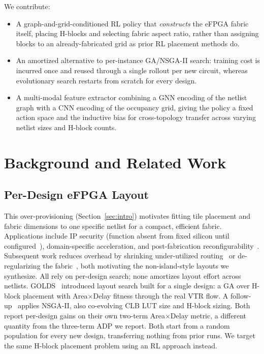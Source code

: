 \documentclass[sigconf]{acmart}
\begin{document}
\noindent We contribute:
\begin{itemize}[topsep=2pt,itemsep=2pt,leftmargin=2em]
  \item A graph-and-grid-conditioned RL policy that \emph{constructs} the
        eFPGA fabric itself, placing H-blocks and selecting fabric aspect
        ratio, rather than assigning blocks to an already-fabricated grid
        as prior RL placement methods do.
  \item An amortized alternative to per-instance GA/NSGA-II search:
        training cost is incurred once and reused through a single rollout
        per new circuit, whereas evolutionary search restarts from scratch
        for every design.
  \item A multi-modal feature extractor combining a GNN encoding of the
        netlist graph with a CNN encoding of the occupancy grid, giving the
        policy a fixed action space and the inductive bias for
        cross-topology transfer across varying netlist sizes and H-block
        counts.
\end{itemize}

\section{Background and Related Work}
\label{sec:related}

\subsection{Per-Design eFPGA Layout}

This over-provisioning (Section~\ref{sec:intro}) motivates fitting tile
placement and fabric dimensions to one specific netlist for a compact,
efficient fabric. Applications include IP security
(function absent from fixed silicon until configured~\cite{alice,arianna}),
domain-specific acceleration, and post-fabrication reconfigurability~\cite{golds}.
Subsequent work reduces overhead by shrinking under-utilized routing~\cite{shell}
or de-regularizing the fabric~\cite{nuredact}, both motivating the
non-island-style layouts we synthesize. All rely on per-design
search; none amortizes layout effort across netlists.
GOLDS~\cite{golds} introduced layout search built for a single design: a GA over
H-block placement with Area$\times$Delay fitness through the real VTR flow.
A follow-up~\cite{nsgaii} applies NSGA-II, also co-evolving CLB LUT size
and H-block sizing. Both report per-design gains on their own two-term
Area$\times$Delay metric, a different quantity from the three-term ADP
we report. Both start from a random
population for every new design, transferring
nothing from prior runs. We target the same H-block placement problem using
an RL approach instead.
\end{document}
